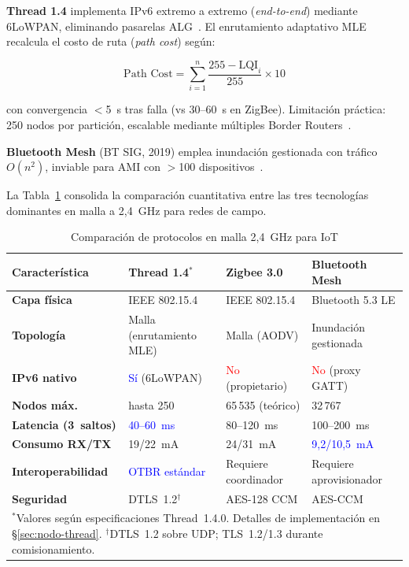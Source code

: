 \textbf{Thread 1.4} implementa IPv6 extremo a extremo (\emph{end-to-end}) mediante 6LoWPAN, eliminando pasarelas ALG~\cite{threadMatterConvergence2024}. El enrutamiento adaptativo MLE recalcula el costo de ruta (\emph{path cost}) según:

\begin{equation}
\text{Path Cost} = \sum_{i=1}^{n} \frac{255 - \text{LQI}_i}{255} \times 10
\end{equation}

con convergencia $<$5~s tras falla (vs 30--60~s en ZigBee). Limitación práctica: 250 nodos por partición, escalable mediante múltiples Border Routers~\cite{openthread2024,abdulsalamOverviewRecentWireless2024}.

\textbf{Bluetooth Mesh} (BT SIG, 2019) emplea inundación gestionada con tráfico $O(n^2)$, inviable para AMI con $>$100 dispositivos~\cite{bluetoothsig2019,choudharyInternetThingsComprehensive2024}.

La Tabla~\ref{tab:mesh-comparison} consolida la comparación cuantitativa entre las tres tecnologías dominantes en malla a 2,4~GHz para redes de campo.

\begin{table}[H]
\centering
\caption{Comparación de protocolos en malla 2,4~GHz para IoT}
\label{tab:mesh-comparison}
\footnotesize
\begin{tabularx}{\textwidth}{|l|X|X|X|}
\hline
\rowcolor{gray!20}
\textbf{Característica} & \textbf{Thread 1.4}$^{*}$ & \textbf{Zigbee 3.0} & \textbf{Bluetooth Mesh} \\
\hline
\textbf{Capa física} & IEEE 802.15.4 & IEEE 802.15.4 & Bluetooth 5.3 LE \\
\hline
\textbf{Topología} & Malla (enrutamiento MLE) & Malla (AODV) & Inundación gestionada \\
\hline
\textbf{IPv6 nativo} & \textcolor{blue}{Sí} (6LoWPAN) & \textcolor{red}{No} (propietario) & \textcolor{red}{No} (proxy GATT) \\
\hline
\textbf{Nodos máx.} & hasta 250 & 65\,535 (teórico) & 32\,767 \\
\hline
\textbf{Latencia (3~saltos)} & \textcolor{blue}{40--60~ms} & 80--120~ms & 100--200~ms \\
\hline
\textbf{Consumo RX/TX} & 19/22~mA & 24/31~mA & \textcolor{blue}{9,2/10,5~mA} \\
\hline
\textbf{Interoperabilidad} & \textcolor{blue}{OTBR estándar} & Requiere coordinador & Requiere aprovisionador \\
\hline
\textbf{Seguridad} & DTLS~1.2$^{\dagger}$ & AES-128 CCM & AES-CCM \\
\hline
\multicolumn{4}{|p{\dimexpr\textwidth-2\tabcolsep\relax}|}{\footnotesize $^{*}$Valores según especificaciones Thread~1.4.0. Detalles de implementación en §\ref{sec:nodo-thread}. $^{\dagger}$DTLS~1.2 sobre UDP; TLS~1.2/1.3 durante comisionamiento.} \\
\hline
\end{tabularx}
\end{table}

